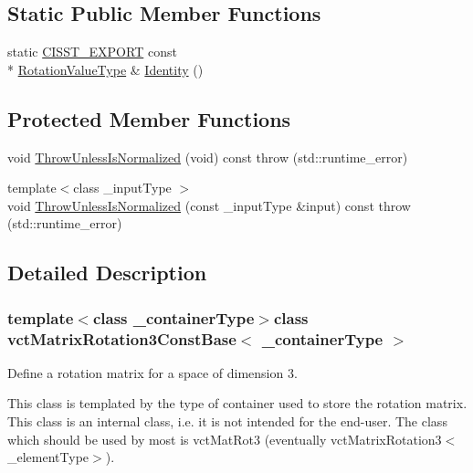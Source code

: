 \subsection*{Static Public Member Functions}
\begin{DoxyCompactItemize}
\item 
static \hyperlink{cmn_export_macros_8h_a99393e0c3ac434b2605235bbe20684f8}{C\-I\-S\-S\-T\-\_\-\-E\-X\-P\-O\-R\-T} const \\*
\hyperlink{classvct_matrix_rotation3_const_base_a913ecee79856db867ac6d45d27cfe362}{Rotation\-Value\-Type} \& \hyperlink{classvct_matrix_rotation3_const_base_addc1008b40782a836ca101f16b6f9de8}{Identity} ()
\end{DoxyCompactItemize}
\subsection*{Protected Member Functions}
\begin{DoxyCompactItemize}
\item 
void \hyperlink{classvct_matrix_rotation3_const_base_aee8cc510b855f90a37ff8c670d6b0557}{Throw\-Unless\-Is\-Normalized} (void) const   throw (std\-::runtime\-\_\-error)
\item 
{\footnotesize template$<$class \-\_\-input\-Type $>$ }\\void \hyperlink{classvct_matrix_rotation3_const_base_aea7676e36ddcb2600bd6283debf47634}{Throw\-Unless\-Is\-Normalized} (const \-\_\-input\-Type \&input) const   throw (std\-::runtime\-\_\-error)
\end{DoxyCompactItemize}


\subsection{Detailed Description}
\subsubsection*{template$<$class \-\_\-container\-Type$>$class vct\-Matrix\-Rotation3\-Const\-Base$<$ \-\_\-container\-Type $>$}

Define a rotation matrix for a space of dimension 3. 

This class is templated by the type of container used to store the rotation matrix. This class is an internal class, i.\-e. it is not intended for the end-\/user. The class which should be used by most is vct\-Mat\-Rot3 (eventually vct\-Matrix\-Rotation3$<$\-\_\-element\-Type$>$).

